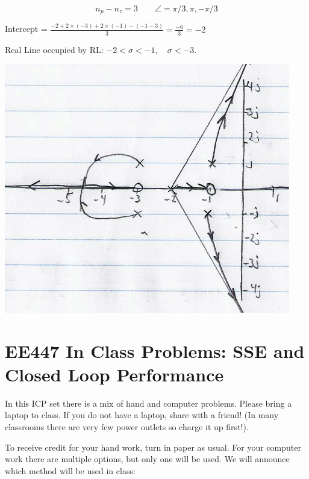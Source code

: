 \documentclass{article}	%
\begin{document}
\begin{solution}

\[
n_p-n_z = 3 \qquad \angle = \pi/3, \pi, -\pi/3
\]

Intercept = $\frac{-2+2\times(-3)+2\times(-1) - (-1-3)}{3} = \frac{-6}{3} = -2$

Real Line occupied by RL:   $-2 < \sigma < -1, \quad \sigma < -3$.

\includegraphics[width=125mm]{rl.png}


\end{solution}







\newpage
\section{EE447 In Class Problems: SSE and Closed Loop Performance}

In this ICP set there is a mix of hand and computer problems.  Please bring a laptop to class.  If you do not have a laptop, share with a friend!   (In many classrooms there are very few power outlets so charge it up first!).

To receive credit for your hand work, turn in paper as usual.  For your computer work there are multiple options, but only one will be used.   We will announce which method will be used in class:
\end{document}
